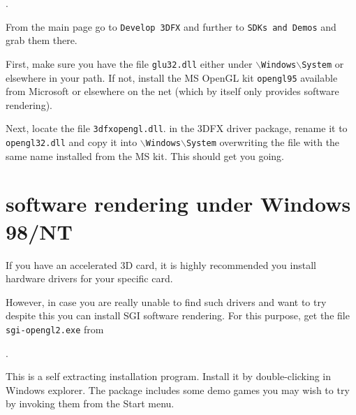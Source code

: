 .

\noindent
 From the main page go to \texttt{Develop 3DFX} and further to \texttt{SDKs and
Demos} and grab them there.

First, make sure you have the file \texttt{glu32.dll} either under
\texttt{$\backslash$Windows$\backslash$System} or elsewhere in your path. If not, install
the MS OpenGL kit \texttt{opengl95} available from Microsoft or elsewhere on the net
(which by itself only provides software rendering).

Next, locate the file \texttt{3dfxopengl.dll}. in the 3DFX driver package, rename it to
\texttt{opengl32.dll} and copy it into \texttt{$\backslash$Windows$\backslash$System}
overwriting the file with the same name installed from the MS kit. This should get you
going.

\section{ software rendering
under Windows 98/NT\label{softrend}}

If you have an accelerated 3D card, it is highly recommended you
install hardware  drivers for your specific card.

However, in case you are really unable to find such drivers and
want to try \FlightGear despite this you can install SGI software
 rendering. For this purpose, get the file
\texttt{sgi-opengl2.exe} from

.

 \noindent
This is a  self extracting installation
program. Install it by double-clicking in Windows explorer. The
package includes some demo games you may wish to try by invoking
them from the Start menu.

